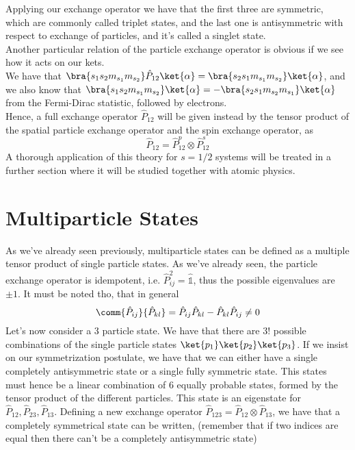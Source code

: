 \documentclass[a4paper, 11pt]{book}
\newcommand{\1}{\opr{\mathds{1}}}
\newcommand{\opr}[1]{\hat{#1}}
\theoremstyle{plain}
\begin{document}
	Applying our exchange operator we have that the first three are symmetric, which are commonly called triplet states, and the last one is antisymmetric with respect to exchange of particles, and it's called a singlet state.\\
	Another particular relation of the particle exchange operator is obvious if we see how it acts on our kets.\\
	We have that $\bra{s_1s_2m_{s_1}m_{s_2}}\opr{P}_{12}\ket{\alpha}=\bra{s_2s_1m_{s_1}m_{s_2}}\ket{\alpha}$, and we also know that $\bra{s_1s_2m_{s_1}m_{s_2}}\ket{\alpha}=-\bra{s_2s_1m_{s_2}m_{s_1}}\ket{\alpha}$ from the Fermi-Dirac statistic, followed by electrons.\\
	Hence, a full exchange operator $\opr{P}_{12}$ will be given instead by the tensor product of the spatial particle exchange operator and the spin exchange operator, as
	\begin{equation*}
		\opr{P}_{12}=\opr{P}_{12}^p\otimes\opr{P}_{12}^s
	\end{equation*}
	A thorough application of this theory for $s=1/2$ systems will be treated in a further section where it will be studied together with atomic physics.
	\section{Multiparticle States}
	As we've already seen previously, multiparticle states can be defined as a multiple tensor product of single particle states. As we've already seen, the particle exchange operator is idempotent, i.e. $\opr{P}_{ij}^2=\1$, thus the possible eigenvalues are $\pm1$. It must be noted tho, that in general
	\begin{equation}
		\comm{\opr{P}_{ij}}{\opr{P}_{kl}}=\opr{P}_{ij}\opr{P}_{kl}-\opr{P}_{kl}\opr{P}_{ij}\ne0
		\label{eq:exchangeopnoncomm}
	\end{equation}
	Let's now consider a 3 particle state. We have that there are $3!$ possible combinations of the single particle states $\ket{p_1}\ket{p_2}\ket{p_3}$. If we insist on our symmetrization postulate, we have that we can either have a single completely antisymmetric state or a single fully symmetric state. This states must hence be a linear combination of 6 equally probable states, formed by the tensor product of the different particles. This state is an eigenstate for $\opr{P}_{12}, \opr{P}_{23}, \opr{P}_{13}$. Defining a new exchange operator $\opr{P}_{123}=\opr{P}_{12}\otimes\opr{P}_{13}$, we have that a completely symmetrical state can be written, (remember that if two indices are equal then there can't be a completely antisymmetric state)
\end{document}
